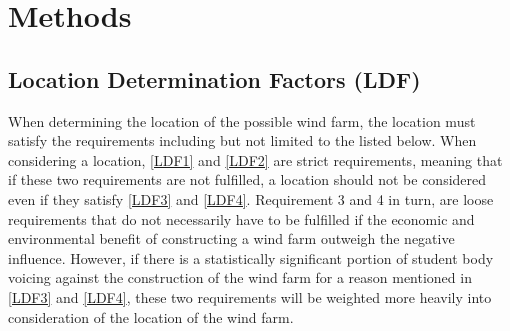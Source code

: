 \documentclass[review]{elsarticle}
\begin{document}
\section{Methods}
\label{sec:methods}

\subsection{Location Determination Factors (LDF)}
When determining the location of the possible wind farm, the location must satisfy the requirements including but not limited to the 
listed below. When considering a location, \ref{LDF1} and \ref{LDF2} are strict requirements, meaning that if these two requirements are not 
fulfilled, a location should not be considered even if they satisfy \ref{LDF3} and \ref{LDF4}. Requirement 3 and 4 in turn, are loose requirements 
that do not necessarily have to be fulfilled if the economic and environmental benefit of constructing a wind farm outweigh the negative 
influence. However, if there is a statistically significant portion of student body voicing against the construction of the wind farm for 
a reason mentioned in \ref{LDF3} and \ref{LDF4}, these two requirements will be weighted more heavily into consideration of the location of the wind farm.
\end{document}

